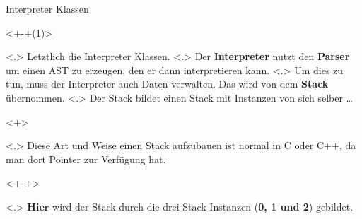   \begin{frame}{Interpreter Klassen}
    \begin{uncoverenv}<+-+(1)>%
          \note[item]<.>{
            Letztlich die Interpreter Klassen.
          }
          \note[item]<.>{
            Der \textbf{Interpreter} nutzt den \textbf{Parser} um einen AST zu erzeugen, den er dann interpretieren kann.
          }
          \note[item]<.>{
            Um dies zu tun, muss der Interpreter auch Daten verwalten. Das wird von dem \textbf{Stack} übernommen.
          }
          \note[item]<.>{
            Der Stack bildet einen Stack mit Instanzen von sich selber \ldots
          }
      \begin{uncoverenv}<+>%
      \end{uncoverenv}%
          \note[item]<.>{
             Diese Art und Weise einen Stack aufzubauen ist normal in C oder C++, da man dort Pointer zur Verfügung hat.
          }
    \end{uncoverenv}
    \begin{uncoverenv}<+-+>%
          \note[item]<.>{
            \textbf{Hier} wird der Stack durch die drei Stack Instanzen (\textbf{0, 1 und 2}) gebildet.
          }

\end{uncoverenv}
\end{frame}
